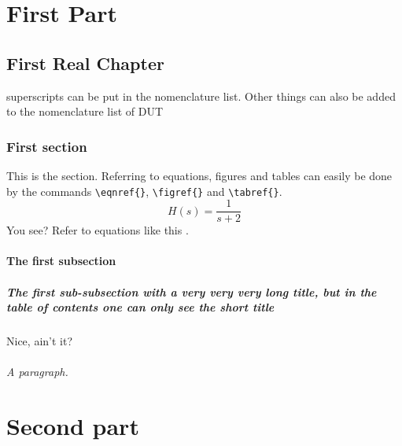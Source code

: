 
    \part{First Part}

    \chapter{First Real Chapter}

    superscripts can be put in the nomenclature  list. 
    Other things can also
    be added to the nomenclature list of \ac{DUT} 

        \section{First section}

        This is the section. Referring to equations, figures and tables can easily be done by the commands \verb"\eqnref{}",
        \verb"\figref{}" and \verb"\tabref{}".
        \begin{equation}\label{eq:First}
              H(s) = \frac{1}{s+2}
        \end{equation}
        You see? Refer to equations like this .
            \subsection{The first subsection}

                \subsubsection[Subsection Short Title]{The first sub-subsection with a very very very long title, but in the table of contents one can only see the short title}

                Nice, ain't it?

                    \paragraph{A paragraph.}
    \part{Second part}

